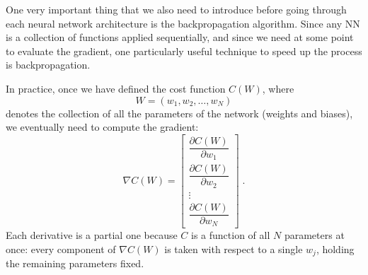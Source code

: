 \documentclass[12pt,a4paper]{article}
\begin{document}
\begin{center}
	
\end{center}

One very important thing that we also need to introduce before going through each neural network architecture is the backpropagation algorithm. Since any NN is a collection of functions applied sequentially, and since we need at some point to evaluate the gradient, one particularly useful technique to speed up the process is backpropagation.

In practice, once we have defined the cost function $C(W)$, where
\begin{equation*}
	W = (w_1, w_2, \dots, w_N)
\end{equation*}
denotes the collection of all the parameters of the network (weights and biases), we eventually need to compute the gradient:
\begin{equation*}
	\nabla C(W) = \begin{bmatrix}
		\dfrac{\partial C(W)}{\partial w_1}\\[12pt]
		\dfrac{\partial C(W)}{\partial w_2}\\[12pt]
		\vdots\\
		\dfrac{\partial C(W)}{\partial w_N}
	\end{bmatrix}\;.
\end{equation*}
Each derivative is a partial one because $C$ is a function of all $N$ parameters at once: every component of $\nabla C(W)$ is taken with respect to a single $w_j$, holding the remaining parameters fixed.
\end{document}
